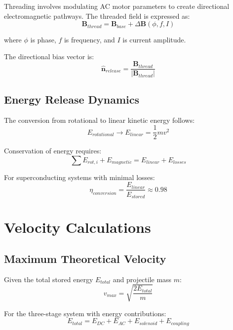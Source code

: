 \documentclass[12pt,a4paper]{article}
\begin{document}
Threading involves modulating AC motor parameters to create directional electromagnetic pathways. The threaded field is expressed as:
\begin{equation}
\mathbf{B}_{thread} = \mathbf{B}_{base} + \Delta\mathbf{B}(\phi, f, I)
\end{equation}

where $\phi$ is phase, $f$ is frequency, and $I$ is current amplitude.

The directional bias vector is:
\begin{equation}
\hat{\mathbf{n}}_{release} = \frac{\mathbf{B}_{thread}}{|\mathbf{B}_{thread}|}
\end{equation}

\subsection{Energy Release Dynamics}

The conversion from rotational to linear kinetic energy follows:
\begin{equation}
E_{rotational} \rightarrow E_{linear} = \frac{1}{2}mv^2
\end{equation}

Conservation of energy requires:
\begin{equation}
\sum E_{rot,i} + E_{magnetic} = E_{linear} + E_{losses}
\end{equation}

For superconducting systems with minimal losses:
\begin{equation}
\eta_{conversion} = \frac{E_{linear}}{E_{stored}} \approx 0.98
\end{equation}

\section{Velocity Calculations}

\subsection{Maximum Theoretical Velocity}

Given the total stored energy $E_{total}$ and projectile mass $m$:
\begin{equation}
v_{max} = \sqrt{\frac{2E_{total}}{m}}
\end{equation}

For the three-stage system with energy contributions:
\begin{equation}
E_{total} = E_{DC} + E_{AC} + E_{solenoid} + E_{coupling}
\end{equation}
\end{document}

